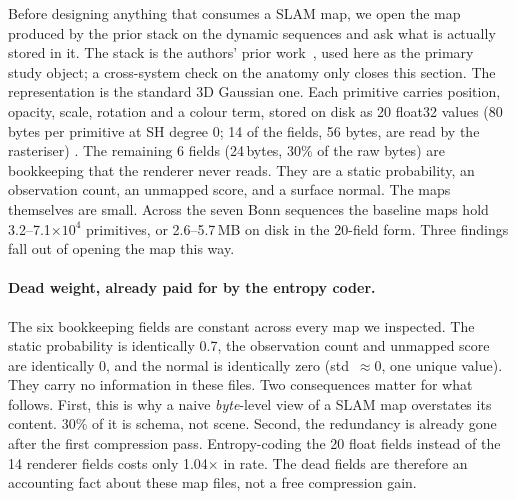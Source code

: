 \documentclass[10pt,twocolumn,letterpaper]{article}
\newcommand{\gate}[1]{{#1}} %
\begin{document}
Before designing anything that consumes a SLAM map, we open the map produced by the
prior stack on the dynamic sequences and ask what is actually stored in it. The stack is
the authors' prior work~\cite{RoGSSLAM}, used here as the primary study object; a
cross-system check on the anatomy only closes this section.
The representation is the standard 3D Gaussian one. Each primitive carries position,
opacity, scale, rotation and a colour term, stored on disk as 20 float32 values
(\gate{80}\,bytes per primitive at SH degree 0; \gate{14} of the fields, \gate{56}
bytes, are read by the rasteriser) %
\cite{Kerbl3DGS}. The remaining \gate{6} fields (\gate{24}\,bytes, \gate{30\%} of the
raw bytes) are bookkeeping that the renderer never reads. They are a static probability, an
observation count, an unmapped score, and a surface normal. %
The maps themselves are small. Across the seven Bonn sequences the baseline maps hold
\gate{3.2--7.1$\times 10^4$}
primitives, or \gate{2.6--5.7}\,MB on disk in the 20-field form. %
Three findings fall out
of opening the map this way.

\paragraph{Dead weight, already paid for by the entropy coder.}
The six bookkeeping fields are constant across every map we inspected. The static probability is
identically \gate{0.7}, the observation count and unmapped score are
identically \gate{0}, and the normal is identically zero %
(std~$\approx 0$, one unique value). They carry no information in these files. Two consequences matter
for what follows. First, this is why a naive \emph{byte}-level view of a SLAM map overstates its
content. 30\% of it is schema, not scene. Second, the redundancy is already gone after the first
compression pass. Entropy-coding the 20 float fields instead of the \gate{14} renderer fields costs
only \gate{1.04$\times$} in rate. %
The dead fields are therefore an accounting fact about these map files, not a
free compression gain.
\end{document}
